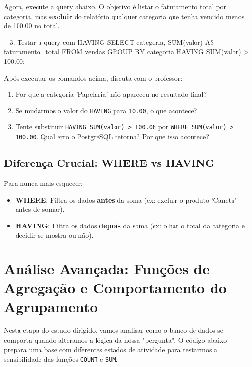 Agora, execute a query abaixo. O objetivo é listar o faturamento total por categoria, mas \textbf{excluir} do relatório qualquer categoria que tenha vendido menos de 100.00 no total.

\begin{sqlcode}
-- 3. Testar a query com HAVING
SELECT categoria, SUM(valor) AS faturamento_total
FROM vendas
GROUP BY categoria
HAVING SUM(valor) > 100.00;
\end{sqlcode}

\begin{tcolorbox}[colback=orange!5,colframe=orange!75!black,title=Questionário de Reflexão]
Após executar os comandos acima, discuta com o professor:
\begin{enumerate}
    \item Por que a categoria 'Papelaria' não apareceu no resultado final?
    \item Se mudarmos o valor do \texttt{HAVING} para \texttt{10.00}, o que acontece?
    \item Tente substituir \texttt{HAVING SUM(valor) > 100.00} por \texttt{WHERE SUM(valor) > 100.00}. Qual erro o PostgreSQL retorna? Por que isso acontece?
\end{enumerate}
\end{tcolorbox}

\subsection{Diferença Crucial: WHERE vs HAVING}

Para nunca mais esquecer:
\begin{itemize}
    \item \textbf{WHERE}: Filtra os dados \textbf{antes} da soma (ex: excluir o produto 'Caneta' antes de somar).
    \item \textbf{HAVING}: Filtra os dados \textbf{depois} da soma (ex: olhar o total da categoria e decidir se mostra ou não).
\end{itemize}

\section{Análise Avançada: Funções de Agregação e Comportamento do Agrupamento}

Nesta etapa do estudo dirigido, vamos analisar como o banco de dados se comporta quando alteramos a lógica da nossa "pergunta". O código abaixo prepara uma base com diferentes estados de atividade para testarmos a sensibilidade das funções \texttt{COUNT} e \texttt{SUM}.

